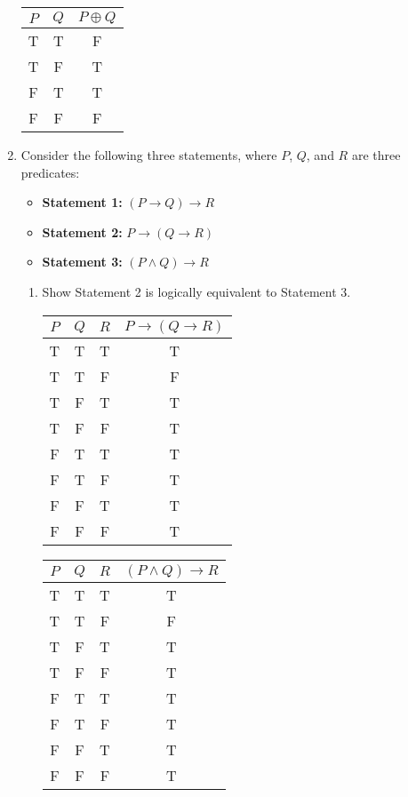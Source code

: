 \documentclass[11pt]{amsart}
\begin{document}
\begin{spacing}{1.2}
\begin{enumerate}
\vspace{1em}
\begin{tabular}{c|c|c}
    $P$ & $Q$ & $P \oplus Q$ \\
    \hline
    T & T & F \\
    T & F & T \\
    F & T & T \\
    F & F & F
\end{tabular}

\newpage

\item Consider the following three statements, where $P$, $Q$, and $R$ are three predicates:

\begin{itemize}
\item {\bf Statement 1:} $(P \rightarrow Q) \rightarrow R$
\item {\bf Statement 2:} $P \rightarrow (Q \rightarrow R)$
\item {\bf Statement 3:} $(P \wedge Q) \rightarrow R$
\end{itemize}

\begin{enumerate}
\item Show  Statement 2 is logically equivalent to Statement 3.

\vspace{1em}
\begin{minipage}{0.45\textwidth}
    \centering
    \begin{tabular}{c|c|c|c}
        $P$ & $Q$ & $R$ & $P \rightarrow (Q \rightarrow R)$ \\
        \hline
        T & T & T & T \\
        T & T & F & F \\
        T & F & T & T \\
        T & F & F & T \\
        F & T & T & T \\
        F & T & F & T \\
        F & F & T & T \\
        F & F & F & T
    \end{tabular}
\end{minipage}
\hfill
\begin{minipage}{0.45\textwidth}
    \centering
    \begin{tabular}{c|c|c|c}
        $P$ & $Q$ & $R$ & $(P \wedge Q) \rightarrow R$ \\
        \hline
        T & T & T & T \\
        T & T & F & F \\
        T & F & T & T \\
        T & F & F & T \\
        F & T & T & T \\
        F & T & F & T \\
        F & F & T & T \\
        F & F & F & T
        \end{tabular}
\end{minipage}


\end{enumerate}
\end{enumerate}
\end{spacing}
\end{document}
